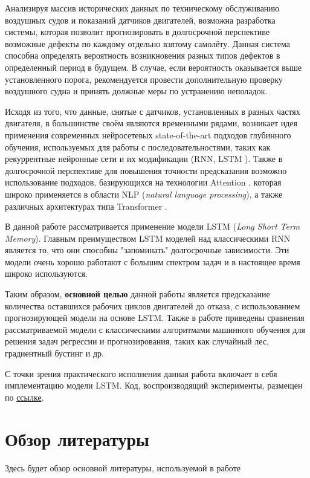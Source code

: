 \documentclass[14pt]{extarticle}
\begin{document}
Анализируя массив исторических данных по техническому обслуживанию воздушных судов и показаний датчиков двигателей, возможна разработка системы, которая позволит прогнозировать в долгосрочной перспективе возможные дефекты по каждому отдельно взятому самолёту. Данная система способна определять вероятность возникновения разных типов дефектов в определенный период в будущем. В случае, если вероятность оказывается выше установленного порога, рекомендуется провести дополнительную проверку воздушного судна и принять должные меры по устранению неполадок.

Исходя из того, что данные, снятые с датчиков, установленных в разных частях двигателя, в большинстве своём являются временными рядами, возникает идея применения современных нейросетевых state-of-the-art подходов глубинного обучения, используемых для работы с последовательностями, таких как рекуррентные нейронные сети и их модификации (RNN, LSTM ). Также в долгосрочной перспективе для повышения точности предсказания возможно использование подходов, базирующихся на технологии Attention \cite{Liu2018DeepRL}, которая широко применяется в области NLP ({\it natural language processing}), а также различных архитектурах типа Transformer \cite{Liu2018DeepRL}.

В данной работе рассматривается применение модели LSTM ({\it Long Short Term Memory}). Главным преимуществом LSTM моделей над классическими RNN является то, что они способны "запоминать" долгосрочные зависимости. Эти модели очень хорошо работают с большим спектром задач и в настоящее время широко используются.

Таким образом, {\bf основной целью} данной работы является предсказание количества оставшихся рабочих циклов двигателей до отказа, с использованием прогнозирующей модели на основе LSTM. Также в работе приведены сравнения рассматриваемой модели с классическими алгоритмами машинного обучения для решения задач регрессии и прогнозирования, таких как случайный лес, градиентный бустинг и др. 

С точки зрения практического исполнения данная работа включает в себя имплементацию модели LSTM. Код, воспроизводящий эксперименты, размещен по \href{https://github.com/teslyuk/bachelors-thesis}{ссылке}.

\newpage

\section{Обзор литературы}
Здесь будет обзор основной литературы, используемой в работе
\end{document}

